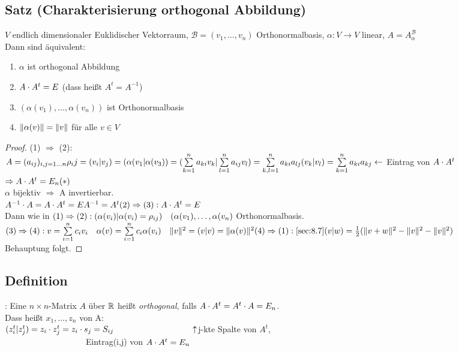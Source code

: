 \subsection{Satz (Charakterisierung orthogonal Abbildung)}\label{sec:\thesubsection}
$V$ endlich dimensionaler Euklidischer Vektorraum, $\mathcal{B} = (v_1,\ldots, v_n)$ Orthonormalbasis, $\alpha : V \to V$ linear, $A = A^\mathcal{B}_\alpha$\\
Dann sind äquivalent:
\begin{enumerate}[(1)]
\item $\alpha $ ist orthogonal Abbildung
\item $A \cdot A^{t} = E$ (dass hei\ss t $A^{t} = A^{-1}$)
\item $(\alpha(v_1),\ldots,\alpha(v_n))$ ist Orthonormalbasis
\item $\Vert\alpha(v)\Vert = \Vert v\Vert $ für alle $v \in V$
\end{enumerate}
\begin{proof}
(1) $\Rightarrow$ (2):\\
$A = (a_{ij})_{i,j = 1\ldots n}\\
\rho_ij = (v_i|v_j) = (\alpha(v_1|\alpha(v_3)) = (\sum\limits^{n}_{k=1} a_{ki} v_k | \sum\limits^{n}_{l=1} a_{ij} v_l) = \sum\limits^{n}_{k,l=1} a_{ki}a_{lj} (v_k|v_l) = \sum\limits^{n}_{k=1}a_{ki}a_{kj} \leftarrow$ Eintrag von $A \cdot A^t$\\
$\Rightarrow A \cd A^{t} = E_n \hfill(\ast)$\\
$\alpha$ bijektiv $\Rightarrow$ A invertierbar.\\
$A^{-1} \cdot A = A \cdot A^{t} = E\\
A^{-1} = A^t\\
(2) \Rightarrow (3): A \cdot A^{t} = E$\\
Dann wie in $(1) \Rightarrow (2):\\
(\alpha(v_i)|\alpha(v_i) = \rho_{ij})\quad (\alpha(v_1),\ldots,\alpha(v_n)$ Orthonormalbasis.\\
$(3) \Rightarrow (4):\\
v = \sum\limits^{n}_{i=1} c_iv_i\quad
\alpha(v) = \sum\limits^{n}_{i=1}c_i\alpha(v_i)\quad
\Vert v\Vert^2 = (v|v) = \Vert\alpha(v)\Vert^2\\
(4) \Rightarrow (1):\\
\ref{sec:8.7} (v|w) = \frac12 (\Vert v+w\Vert^2 - \Vert v\Vert^2 - \Vert v\Vert ^2)$\\
Behauptung folgt.
\end{proof}
\subsection{Definition}\label{sec:\thesubsection}: Eine $n \times n$-Matrix $A$ über $\mathbb{R}$ hei\ss t \emph{orthogonal}, falls $A \cdot A^{t} = A^t \cdot A =E_n$.\\
Dass hei\ss t $x_1,\ldots,z_n$ von A:\\
$(z^t_i|z^t_j) = z_i \cd z_j^t = z_i \cd s_j = S_{ij}\\
\phantom{(z^t_i|z^t_j) = z_i \cd z_j^t = z_ia}\uparrow$j-kte Spalte von $A^t$,\\$\phantom{(z^t_i|z^t_j) = z_i \cd z_j^t = z_ia}$ Eintrag(i,j) von $A \cdot A^t =E_n$
